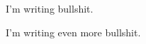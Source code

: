 \documentclass[
11pt, %
english, %
singlespacing, %
headsepline, %
]{StyleSheet} %
\begin{document}
\mainmatter %
\pagestyle{thesis} %

\mainmatter %

  \pagestyle{thesis} %

  I'm writing bullshit.
  

I'm writing even more bullshit.
\end{document}
